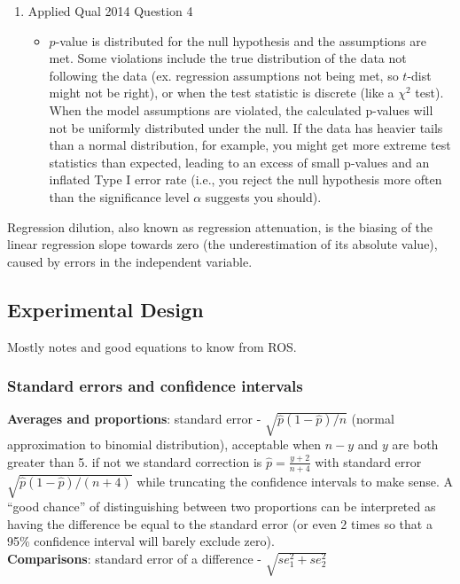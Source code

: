 \documentclass{article}
\begin{document}
\begin{itemize}
\begin{enumerate}[label=(\alph*)]
    \item Applied Qual 2014 Question 4
      \begin{itemize}
        \item $p$-value is distributed for the null hypothesis and the assumptions are met. Some violations include the true distribution of the data not following the data (ex. regression assumptions not being met, so $t$-dist might not be right), or when the test statistic is discrete (like a $\chi^2$ test). When the model assumptions are violated, the calculated p-values will not be uniformly distributed under the null. If the data has heavier tails than a normal distribution, for example, you might get more extreme test statistics than expected, leading to an excess of small p-values and an inflated Type I error rate (i.e., you reject the null hypothesis more often than the significance level $\alpha$ suggests you should).
      \end{itemize}
  \end{enumerate}

\end{itemize}

Regression dilution, also known as regression attenuation, is the biasing of the linear regression slope towards zero (the underestimation of its absolute value), caused by errors in the independent variable.

\subsection{Experimental Design}
Mostly notes and good equations to know from ROS.

\subsubsection{Standard errors and confidence intervals}
\textbf{Averages and proportions}: standard error - $\sqrt{\hat{p}(1-\hat{p})/n}$ (normal approximation to binomial distribution), acceptable when $n - y$ and $y$ are both greater than 5.
if not we standard correction is $\hat{p} = \frac{y + 2}{n+4}$ with standard error $\sqrt{\hat{p}(1 - \hat{p})/(n+4)}$ while truncating the confidence intervals to make sense.
A ``good chance'' of distinguishing between two proportions can be interpreted as having the difference be equal to the standard error (or even 2 times so that a 95\% confidence interval will barely exclude zero).
\\

\textbf{Comparisons}: standard error of a difference - $\sqrt{se_1^2 + se_2^2}$ \\
\end{document}
